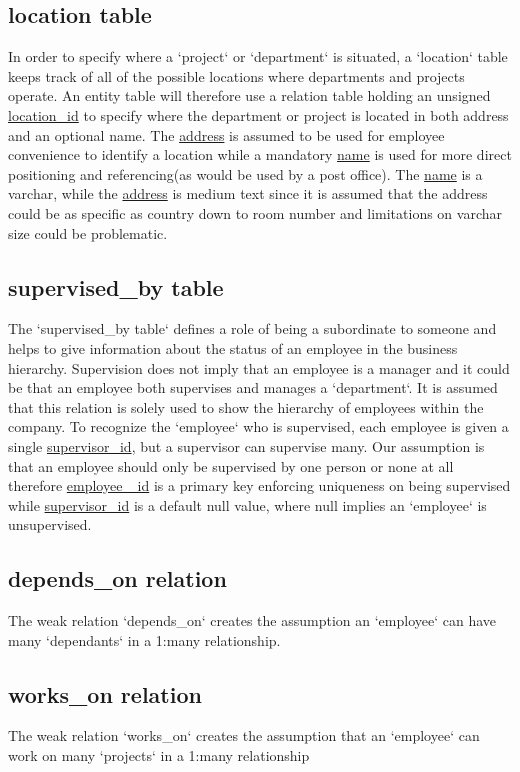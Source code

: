 \documentclass[fleqn, 11pt,letterpaper]{article}
\begin{document}
\subsection{location table}
In order to specify where a `project` or `department` is situated, a `location` table keeps track of all of the possible locations where departments and projects operate. An entity table will therefore use a relation table holding an unsigned \uline{location\_id} to specify where the department or project is located in both address and an optional name. The \uline{address} is assumed to be used for employee convenience to identify a location while a mandatory \uline{name} is used for more direct positioning and referencing(as would be used by a post office). The \uline{name} is a varchar, while the \uline{address} is medium text since it is assumed that the address could be as specific as country down to room number and limitations on varchar size could be problematic.\\

\subsection{supervised\_by table}
The `supervised\_by table` defines a role of being a subordinate to someone and helps to give information about the status of an employee in the business hierarchy. Supervision does not imply that an employee is a manager and it could be that an employee both supervises and manages a `department`. It is assumed that this relation is solely used to show the hierarchy of employees within the company. To recognize the `employee` who is supervised, each employee is given a single \uline{supervisor\_id}, but a supervisor can supervise many. Our assumption is that an employee should only be supervised by one person or none at all therefore \uline{employee \_id} is a primary key enforcing uniqueness on being supervised while \uline{supervisor\_id} is a default null value, where null implies an `employee` is unsupervised.\\

\subsection{depends\_on relation}
	The weak relation  `depends\_on` creates the assumption an `employee` can have many `dependants` in a 1:many relationship.
	
\subsection{works\_on relation}
	The weak relation `works\_on` creates the assumption that an `employee` can work on many `projects` in a 1:many relationship
\end{document}

